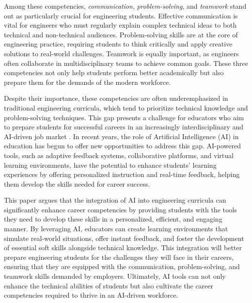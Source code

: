 \documentclass[conference]{IEEEtran}
\begin{document}
Among these competencies, \textit{communication}, \textit{problem-solving}, and \textit{teamwork} stand out as particularly crucial for engineering students. Effective communication is vital for engineers who must regularly explain complex technical ideas to both technical and non-technical audiences\cite{Rusmiyanto23}. Problem-solving skills are at the core of engineering practice, requiring students to think critically and apply creative solutions to real-world challenges. Teamwork is equally important, as engineers often collaborate in multidisciplinary teams to achieve common goals. These three competencies not only help students perform better academically but also prepare them for the demands of the modern workforce\cite{wef2023}.

Despite their importance, these competencies are often underemphasized in traditional engineering curricula, which tend to prioritize technical knowledge and problem-solving techniques\cite{Rovida22}. This gap presents a challenge for educators who aim to prepare students for successful careers in an increasingly interdisciplinary and AI-driven job market . In recent years, the role of Artificial Intelligence (AI) in education has begun to offer new opportunities to address this gap. AI-powered tools, such as adaptive feedback systems, collaborative platforms, and virtual learning environments, have the potential to enhance students' learning experiences by offering personalized instruction and real-time feedback, helping them develop the skills needed for career success.



This paper argues that the integration of AI into engineering curricula can significantly enhance career competencies by providing students with the tools they need to develop these skills in a personalized, efficient, and engaging manner. By leveraging AI, educators can create learning environments that simulate real-world situations, offer instant feedback, and foster the development of essential soft skills alongside technical knowledge. This integration will better prepare engineering students for the challenges they will face in their careers, ensuring that they are equipped with the communication, problem-solving, and teamwork skills demanded by employers. Ultimately, AI tools can not only enhance the technical abilities of students but also cultivate the career competencies required to thrive in an AI-driven workforce.
\end{document}
